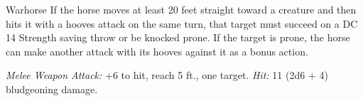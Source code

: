 \documentclass[10pt,a4paper,twoside,twocolumn,openany,nodeprecatedcode]{dndbook}
\begin{document}
\begin{DndMonster}[float=ht]{Warhorse}
\DndMonsterBasics[
armor-class = {11},
hit-points = {\DndDice{3d10 + 3}},
speed = {60 ft.}
]
\DndMonsterAbilityScores[
 str = 18,
 dex = 12,
 con = 13,
 int = 2,
 wis = 12,
 cha = 7
]
\DndMonsterDetails[
challenge = 1/2,
]
If the horse moves at least 20 feet straight toward a creature and then hits it with a hooves attack on the same turn, that target must succeed on a DC 14 Strength saving throw or be knocked prone. If the target is prone, the horse can make another attack with its hooves against it as a bonus action.

\par
{}
\textsl{Melee Weapon Attack:} +6 to hit, reach 5 ft., one target. \textsl{Hit:} 11 (2d6 + 4) bludgeoning damage.

\end{DndMonster}


\clearpage
{}
\end{document}
